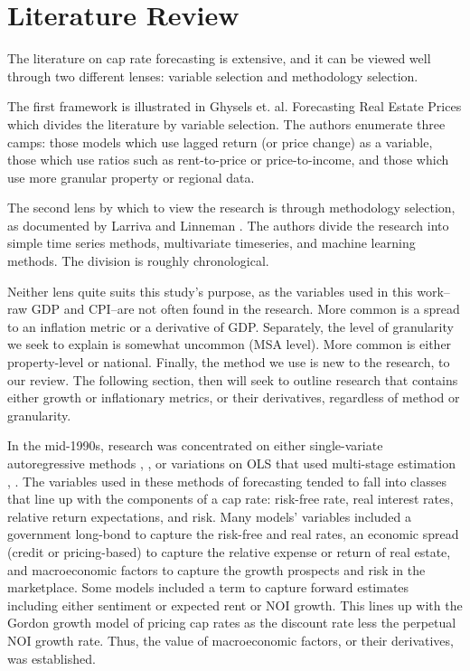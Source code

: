 \label{intro}


\section{Literature Review}

The literature on cap rate forecasting is extensive, and it can be viewed well through two different lenses: variable selection and methodology selection. 

The first framework is illustrated in Ghysels et. al. Forecasting Real Estate Prices \citep*{ghysels_plazzi_valkanov_torous_2013} which divides the literature by variable selection. The authors enumerate three camps: those models which use lagged return (or price change) as a variable, those which use ratios such as rent-to-price or price-to-income, and those which use more granular property or regional data. 

The second lens by which to view the research is through methodology selection, as documented by Larriva and Linneman \citep*{larriva2021determinants}. The authors divide the research into simple time series methods, multivariate timeseries, and machine learning methods. The division is roughly chronological. 

Neither lens quite suits this study's purpose, as the variables used in this work--raw GDP and CPI--are not often found in the research. More common is a spread to an inflation metric or a derivative of GDP. Separately, the level of granularity we seek to explain is somewhat uncommon (MSA level). More common is either property-level or national. Finally, the method we use is new to the research, to our review. The following section, then will seek to outline research that contains either growth or inflationary metrics, or their derivatives, regardless of method or granularity.

In the mid-1990s, research was concentrated on either single-variate autoregressive methods \citep*{gau_1984}, \citep*{gau_1985}, \citep*{linneman_1986} or variations on OLS that used multi-stage estimation \citep*{case_shiller_1990}, \citep*{abraham_hendershott_1994}. The variables used in these methods of forecasting tended to fall into classes that line up with the components of a cap rate: risk-free rate, real interest rates, relative return expectations, and risk. Many models’ variables included a government long-bond  to capture the risk-free and real rates, an economic spread (credit or pricing-based) to capture the relative expense or return of real estate, and macroeconomic factors to capture the  growth prospects and risk in the marketplace. Some models included a term to capture forward estimates including either sentiment or expected rent or NOI growth. This lines up with the Gordon growth model of pricing cap rates as the discount rate less the perpetual NOI growth rate. Thus, the value of macroeconomic factors, or their derivatives, was established.

